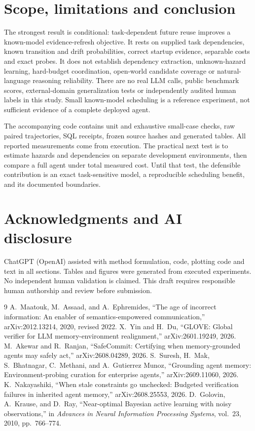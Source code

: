 \documentclass[10pt,letterpaper]{article}
\begin{document}
\section{Scope, limitations and conclusion}
The strongest result is conditional: task-dependent future reuse improves a known-model evidence-refresh objective. It rests on supplied task dependencies, known transition and drift probabilities, correct startup evidence, separable costs and exact probes. It does not establish dependency extraction, unknown-hazard learning, hard-budget coordination, open-world candidate coverage or natural-language reasoning reliability. There are no real LLM calls, public benchmark scores, external-domain generalization tests or independently audited human labels in this study. Small known-model scheduling is a reference experiment, not sufficient evidence of a complete deployed agent.

The accompanying code contains unit and exhaustive small-case checks, raw paired trajectories, SQL receipts, frozen source hashes and generated tables. All reported measurements come from execution. The practical next test is to estimate hazards and dependencies on separate development environments, then compare a full agent under total measured cost. Until that test, the defensible contribution is an exact task-sensitive model, a reproducible scheduling benefit, and its documented boundaries.

\section{Acknowledgments and AI disclosure}
ChatGPT (OpenAI) assisted with method formulation, code, plotting code and text in all sections. Tables and figures were generated from executed experiments. No independent human validation is claimed. This draft requires responsible human authorship and review before submission.

\begin{thebibliography}{9}
 A.~Maatouk, M.~Assaad, and A.~Ephremides, ``The age of incorrect information: An enabler of semantics-empowered communication,'' arXiv:2012.13214, 2020, revised 2022.
 X.~Yin and H.~Du, ``GLOVE: Global verifier for LLM memory-environment realignment,'' arXiv:2601.19249, 2026.
 M.~Akewar and R.~Ranjan, ``SafeCommit: Certifying when memory-grounded agents may safely act,'' arXiv:2608.04289, 2026.
 S.~Suresh, H.~Mak, S.~Bhatnagar, C.~Methani, and A.~Gutierrez Munoz, ``Grounding agent memory: Environment-probing curation for enterprise agents,'' arXiv:2609.11060, 2026.
 K.~Nakayashiki, ``When stale constraints go unchecked: Budgeted verification failures in inherited agent memory,'' arXiv:2608.25553, 2026.
 D.~Golovin, A.~Krause, and D.~Ray, ``Near-optimal Bayesian active learning with noisy observations,'' in \emph{Advances in Neural Information Processing Systems}, vol.~23, 2010, pp.~766--774.
\end{thebibliography}
\end{document}
